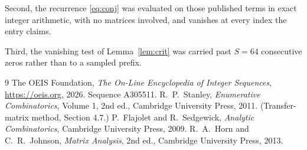 \documentclass[11pt,a4paper]{article}
\theoremstyle{plain}
\theoremstyle{definition}
\begin{document}
Second, the recurrence \eqref{eq:conj} was evaluated on those published terms in exact
integer arithmetic, with no matrices involved, and vanishes at every index the entry claims.

Third, the vanishing test of Lemma~\ref{lem:crit} was carried past $S=64$ consecutive
zeros rather than to a sampled prefix.

\begin{thebibliography}{9}
 The OEIS Foundation, \emph{The On-Line Encyclopedia of Integer
Sequences}, \url{https://oeis.org}, 2026. Sequence A305511.
 R.~P.~Stanley, \emph{Enumerative Combinatorics}, Volume 1, 2nd ed.,
Cambridge University Press, 2011. (Transfer-matrix method, Section 4.7.)
 P.~Flajolet and R.~Sedgewick, \emph{Analytic Combinatorics}, Cambridge
University Press, 2009.
 R.~A.~Horn and C.~R.~Johnson, \emph{Matrix Analysis}, 2nd ed., Cambridge
University Press, 2013.
\end{thebibliography}
\end{document}
